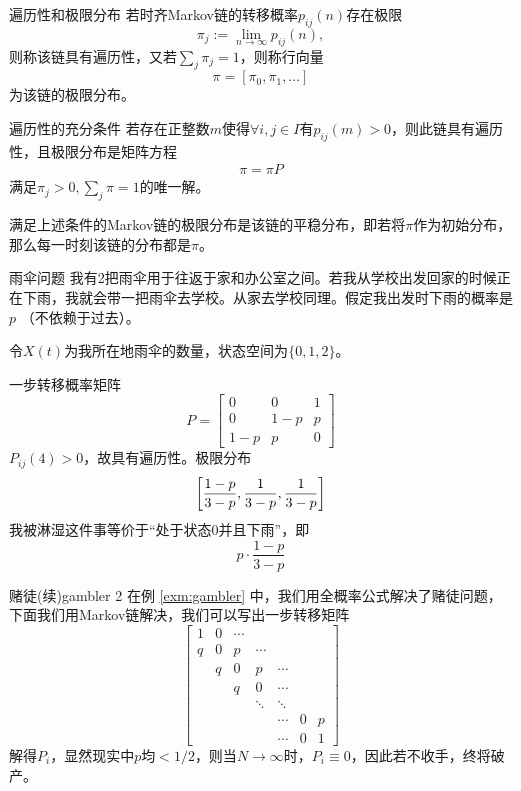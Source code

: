 \begin{definition}{遍历性和极限分布}{}
	若时齐Markov链的转移概率$p_{ij}(n)$存在极限
	\[
		\pi_j:=\lim_{n\to\infty}p_{ij}(n),
	\]
	则称该链具有遍历性，又若$\textstyle\sum_{j}\pi_j=1$，则称行向量
	\[
		\pi=[\pi_0,\pi_1,\ldots]
	\]
	为该链的极限分布。
\end{definition}
\begin{theorem}{遍历性的充分条件}{}
	若存在正整数$m$使得$\forall i,j\in I$有$p_{ij}(m)>0$，则此链具有遍历性，且极限分布是矩阵方程
	\begin{align}
		\pi=\pi P
	\end{align}
	满足$\pi_j>0,\textstyle\sum_j\pi=1$的唯一解。
\end{theorem}
满足上述条件的Markov链的极限分布是该链的平稳分布，即若将$\pi$作为初始分布，那么每一时刻该链的分布都是$\pi$。
\begin{example}{雨伞问题}{}
	我有2把雨伞用于往返于家和办公室之间。若我从学校出发回家的时候正在下雨，我就会带一把雨伞去学校。从家去学校同理。假定我出发时下雨的概率是$ p$ （不依赖于过去）。

	令$ X(t) $为我所在地雨伞的数量，状态空间为$\{0, 1, 2\}$。
	
	一步转移概率矩阵
	\[
		P=\begin{bmatrix}
			0&0&1\\
			0&1-p&p\\
			1-p&p&0
		\end{bmatrix}
	\]
	$P_{ij}(4)>0$，故具有遍历性。极限分布
	\[
		\biggl[\frac{1-p}{3-p},\frac1{3-p},\frac1{3-p}\biggr]
	\]
	我被淋湿这件事等价于“处于状态0并且下雨”，即
	\[
		p\cdot\frac{1-p}{3-p}
	\]
\end{example}
\begin{example}{赌徒(续)}{gambler 2}
	在例 \ref{exm:gambler} 中，我们用全概率公式解决了赌徒问题，下面我们用Markov链解决，我们可以写出一步转移矩阵
	\[
		\begin{bmatrix}
			1&0&\cdots\\
			q&0&p&\cdots\\
			&q&0&p&\cdots\\
			&&q&0&\cdots\\
			&&&\ddots&\ddots\\
			&&&&\cdots&0&p\\
			&&&&\cdots&0&1
		\end{bmatrix}
	\]
	解得$P_i$，显然现实中$p$均$<1/2$，则当$N\to\infty$时，$P_i\equiv 0$，因此若不收手，终将破产。
\end{example}
